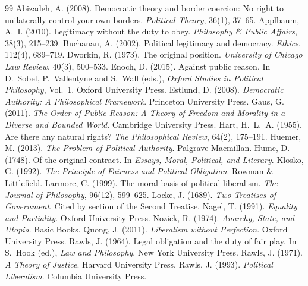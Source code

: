 \documentclass{situationist-preprint}
\begin{document}
\begin{thebibliography}{99}\small
{} Abizadeh, A. (2008). Democratic theory and border coercion: No right to unilaterally control your own borders. \emph{Political Theory}, 36(1), 37--65.
 Applbaum, A.~I. (2010). Legitimacy without the duty to obey. \emph{Philosophy \& Public Affairs}, 38(3), 215--239.
 Buchanan, A. (2002). Political legitimacy and democracy. \emph{Ethics}, 112(4), 689--719.
 Dworkin, R. (1973). The original position. \emph{University of Chicago Law Review}, 40(3), 500--533.
 Enoch, D. (2015). Against public reason. In D.~Sobel, P.~Vallentyne and S.~Wall (eds.), \emph{Oxford Studies in Political Philosophy}, Vol.~1. Oxford University Press.
 Estlund, D. (2008). \emph{Democratic Authority: A Philosophical Framework}. Princeton University Press.
 Gaus, G. (2011). \emph{The Order of Public Reason: A Theory of Freedom and Morality in a Diverse and Bounded World}. Cambridge University Press.
 Hart, H.~L.~A. (1955). Are there any natural rights? \emph{The Philosophical Review}, 64(2), 175--191.
 Huemer, M. (2013). \emph{The Problem of Political Authority}. Palgrave Macmillan.
 Hume, D. (1748). Of the original contract. In \emph{Essays, Moral, Political, and Literary}.
 Klosko, G. (1992). \emph{The Principle of Fairness and Political Obligation}. Rowman \& Littlefield.
 Larmore, C. (1999). The moral basis of political liberalism. \emph{The Journal of Philosophy}, 96(12), 599--625.
 Locke, J. (1689). \emph{Two Treatises of Government}. Cited by section of the Second Treatise.
 Nagel, T. (1991). \emph{Equality and Partiality}. Oxford University Press.
 Nozick, R. (1974). \emph{Anarchy, State, and Utopia}. Basic Books.
 Quong, J. (2011). \emph{Liberalism without Perfection}. Oxford University Press.
 Rawls, J. (1964). Legal obligation and the duty of fair play. In S.~Hook (ed.), \emph{Law and Philosophy}. New York University Press.
 Rawls, J. (1971). \emph{A Theory of Justice}. Harvard University Press.
 Rawls, J. (1993). \emph{Political Liberalism}. Columbia University Press.

\end{thebibliography}
\end{document}
